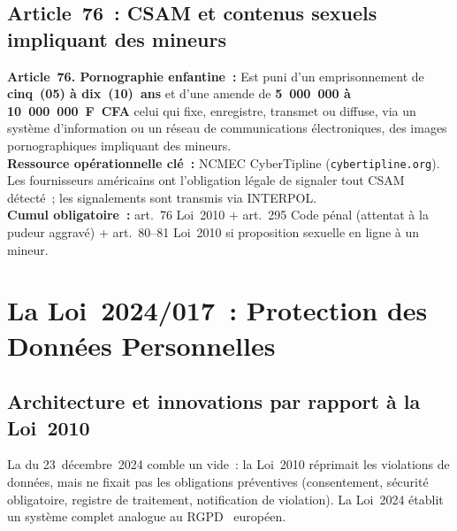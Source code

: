 \subsection{Article~76~: CSAM et contenus sexuels impliquant des mineurs}

\begin{boxjuris}
\textbf{Article~76. Pornographie enfantine~:}
Est puni d'un emprisonnement de \textbf{cinq~(05) à dix~(10)~ans} et
d'une amende de \textbf{5~000~000 à 10~000~000~F~CFA} celui qui fixe,
enregistre, transmet ou diffuse, via un système d'information ou un
réseau de communications électroniques, des images pornographiques
impliquant des mineurs.\\[0.3ex]
\textbf{Ressource opérationnelle clé~:} NCMEC CyberTipline
(\texttt{cybertipline.org}). Les fournisseurs américains ont l'obligation
légale de signaler tout CSAM détecté~; les signalements sont transmis
via INTERPOL.\\[0.3ex]
\textbf{Cumul obligatoire~:} art.~76 Loi~2010 + art.~295 Code pénal
(attentat à la pudeur aggravé) + art.~80--81 Loi~2010 si proposition
sexuelle en ligne à un mineur.
\end{boxjuris}

\section{La Loi~2024/017~: Protection des Données Personnelles}
\label{sec:loi2024}

\subsection{Architecture et innovations par rapport à la Loi~2010}

La  du 23~décembre~2024 comble un vide~: la Loi~2010
réprimait les violations de données, mais ne fixait pas les obligations
préventives (consentement, sécurité obligatoire, registre de traitement,
notification de violation). La Loi~2024 établit un système complet
analogue au RGPD~\cite{rgpd2016} européen.

